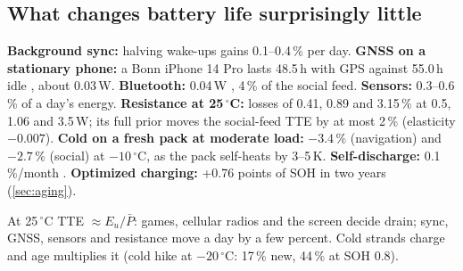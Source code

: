 \subsection{What changes battery life surprisingly little}\label{sec:least}
\textbf{Background sync:} halving wake-ups gains 0.1--0.4\,\% per day. \textbf{GNSS on a stationary phone:} a
Bonn iPhone 14 Pro lasts 48.5\,h with GPS against 55.0\,h idle \cite{SCH26,BONN26}, about 0.03\,W.
\textbf{Bluetooth:} 0.04\,W \cite{CH10}, 4\,\% of the social feed. \textbf{Sensors:} 0.3--0.6\,\% of a day's energy.
\textbf{Resistance at 25\,$^\circ$C:} losses of 0.41, 0.89 and 3.15\,\% at 0.5, 1.06 and 3.5\,W; its full prior
moves the social-feed TTE by at most 2\,\% (elasticity $-0.007$). \textbf{Cold on a fresh pack at moderate
load:} $-3.4\,\%$ (navigation) and $-2.7\,\%$ (social) at $-10\,^\circ$C, as the pack self-heats by 3--5\,K.
\textbf{Self-discharge:} 0.1\,\%/month \cite{ZIL19}. \textbf{Optimized charging:} +0.76 points of SOH in two years
(\cref{sec:aging}).

\begin{keybox}
At 25\,$^\circ$C TTE $\approx E_u/\bar P$: games, cellular radios and the screen decide drain; sync, GNSS,
sensors and resistance move a day by a few percent. Cold strands charge and age multiplies it (cold hike at
$-20\,^\circ$C: 17\,\% new, 44\,\% at SOH 0.8).
\end{keybox}
